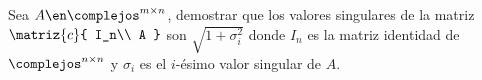 \begin{enunciado}{\ejercicio}
  Sea $A \en \complejos^{m \times n}$, demostrar que los valores singulares de la matriz
  $\matriz{c}{
      I_n\\
      A
    }$ son $\sqrt{1 + \sigma_i^2}$ donde $I_n$ es la matriz identidad de $\complejos^{n \times n}$ y $\sigma_i$ es
  el $i$-ésimo valor singular de $A$.
\end{enunciado}
\hacer
